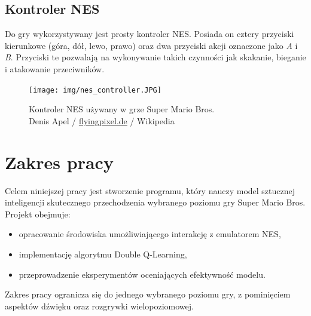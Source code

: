 \subsection{Kontroler NES}

Do gry wykorzystywany jest prosty kontroler NES. Posiada on cztery przyciski kierunkowe (góra, dół, lewo, prawo) oraz dwa przyciski akcji oznaczone jako \textit{A} i \textit{B}. Przyciski te pozwalają na wykonywanie takich czynności jak skakanie, bieganie i atakowanie przeciwników.


\begin{figure}[h!]
    \centering
    \texttt{[image: img/nes\_controller.JPG]}
    \caption{Kontroler NES używany w grze Super Mario Bros.\\Denis Apel / \url{flyingpixel.de} / Wikipedia}
    \label{fig:nes_controller}
\end{figure}

\section{Zakres pracy}
Celem niniejszej pracy jest stworzenie programu, który nauczy model sztucznej inteligencji skutecznego przechodzenia wybranego poziomu gry Super Mario Bros. Projekt obejmuje:
\begin{itemize}
    \item opracowanie środowiska umożliwiającego interakcję z emulatorem NES,
    \item implementację algorytmu Double Q-Learning,
    \item przeprowadzenie eksperymentów oceniających efektywność modelu.
\end{itemize}
Zakres pracy ogranicza się do jednego wybranego poziomu gry, z pominięciem aspektów dźwięku oraz rozgrywki wielopoziomowej.
